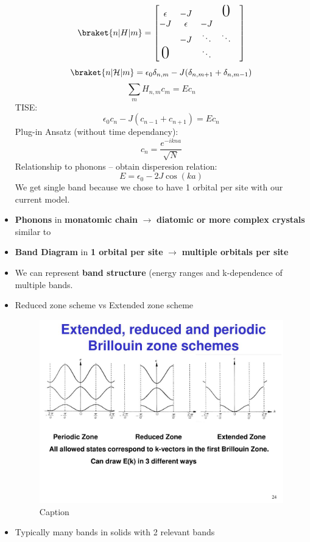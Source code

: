 \begin{itemize}
     \[ \braket{n | H | m} = \begin{bmatrix} 
    \epsilon & -J & &\text{\huge0} &\\
    -J & \epsilon & -J & & \\
    & -J & \ddots & \ddots & \\
    \text{\huge0} & & \ddots & &
    \end{bmatrix}
    \]
    \[ \braket{n|\mathcal{H}|m} = \epsilon_0 \delta_{n,m} - J(\delta_{n,m+1} + \delta_{n, m-1})\]
    \[ \sum_m H_{n,m} c_m = E c_n \]
    TISE: \[ \epsilon_0 c_n - J (c_{n-1} + c_{n+1}) = E c_n\]
    Plug-in Ansatz (without time dependancy): \[ c_n = \frac{e^{-ikna}}{\sqrt{N}} \] 
    Relationship to phonons -- obtain disperesion relation:
    \[ E = \epsilon_0 - 2J \cos(ka) \]
    We get single band because we chose to have 1 orbital per site with our current model.
    \item \textbf{Phonons} in \textbf{monatomic chain} $\rightarrow$  \textbf{ diatomic or more complex crystals} \\
    \vspace{7px}
    similar to 
    \item \textbf{Band Diagram} in \textbf{1 orbital per site} $\rightarrow$ \textbf{multiple orbitals per site}
    \item We can represent \textbf{band structure} (energy ranges and k-dependence of multiple bands.
    \item Reduced zone scheme vs Extended zone scheme
    \begin{figure}
        \centering
        \includegraphics[width = 0.75 \linewidth]{Images/extended-reduced-and-periodic-brillouin-zone-schemes-l.jpg}
        \caption{Caption}
        \label{fig:brillouin zone}
    \end{figure}
    \item Typically many bands in solids with 2 relevant bands

\end{itemize}
